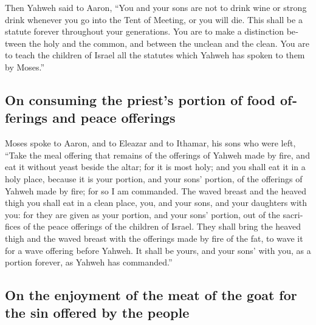 \begin{paracol}{2}
\begin{otherlanguage}{english}
 Then Yahweh said to Aaron,  ``You and your
sons are not to drink wine or strong drink whenever you go into the Tent
of Meeting, or you will die. This shall be a statute forever throughout
your generations.  You are to make a distinction between
the holy and the common, and between the unclean and the clean.
 You are to teach the children of Israel all the statutes
which Yahweh has spoken to them by Moses.''

\hypertarget{on-consuming-the-priests-portion-of-food-offerings-and-peace-offerings}{%
\subsection{On consuming the priest's portion of food offerings and
peace
offerings}\label{on-consuming-the-priests-portion-of-food-offerings-and-peace-offerings}}

 Moses spoke to Aaron, and to Eleazar and to Ithamar, his
sons who were left, ``Take the meal offering that remains of the
offerings of Yahweh made by fire, and eat it without yeast beside the
altar; for it is most holy;  and you shall eat it in a
holy place, because it is your portion, and your sons' portion, of the
offerings of Yahweh made by fire; for so I am commanded. 
The waved breast and the heaved thigh you shall eat in a clean place,
you, and your sons, and your daughters with you: for they are given as
your portion, and your sons' portion, out of the sacrifices of the peace
offerings of the children of Israel.  They shall bring
the heaved thigh and the waved breast with the offerings made by fire of
the fat, to wave it for a wave offering before Yahweh. It shall be
yours, and your sons' with you, as a portion forever, as Yahweh has
commanded.''

\hypertarget{on-the-enjoyment-of-the-meat-of-the-goat-for-the-sin-offered-by-the-people}{%
\subsection{On the enjoyment of the meat of the goat for the sin offered
by the
people}\label{on-the-enjoyment-of-the-meat-of-the-goat-for-the-sin-offered-by-the-people}}


\end{otherlanguage}
\end{paracol}
